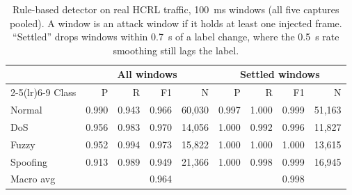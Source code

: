 \begin{table}[t]
\centering
\footnotesize
\caption{Rule-based detector on real HCRL traffic, 100~ms windows (all five captures pooled). A window is an attack window if it holds at least one injected frame. ``Settled'' drops windows within 0.7~s of a label change, where the 0.5~s rate smoothing still lags the label.}
\label{tab:hcrl_rules_perclass}
\begin{tabular}{lrrrrrrrr}
\toprule
& \multicolumn{4}{c}{All windows} & \multicolumn{4}{c}{Settled windows} \\
\cmidrule(lr){2-5}\cmidrule(lr){6-9}
Class & P & R & F1 & N & P & R & F1 & N \\
\midrule
Normal & 0.990 & 0.943 & 0.966 & 60,030 & 0.997 & 1.000 & 0.999 & 51,163 \\
DoS & 0.956 & 0.983 & 0.970 & 14,056 & 1.000 & 0.992 & 0.996 & 11,827 \\
Fuzzy & 0.952 & 0.994 & 0.973 & 15,822 & 1.000 & 1.000 & 1.000 & 13,615 \\
Spoofing & 0.913 & 0.989 & 0.949 & 21,366 & 1.000 & 0.998 & 0.999 & 16,945 \\
\midrule
Macro avg &  &  & 0.964 &  &  &  & 0.998 &  \\
\bottomrule
\end{tabular}
\end{table}
